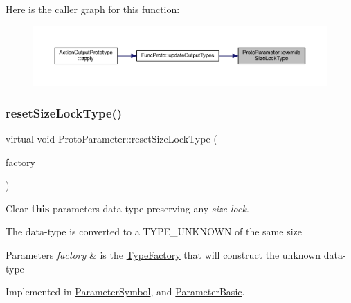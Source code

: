 Here is the caller graph for this function\+:
\nopagebreak
\begin{figure}[H]
\begin{center}
\leavevmode
\includegraphics[width=350pt]{class_proto_parameter_a05418aa9f8e8fa0c7499b99cd51e24d3_icgraph}
\end{center}
\end{figure}
\mbox{\label{class_proto_parameter_a15d92b3da7ab6b1cd6cf52dea6ee2978}} 
\subsubsection{\texorpdfstring{resetSizeLockType()}{resetSizeLockType()}}
{\footnotesize\ttfamily virtual void Proto\+Parameter\+::reset\+Size\+Lock\+Type (\begin{DoxyParamCaption}\item[{\mbox{\hyperlink{class_type_factory}{Type\+Factory}} $\ast$}]{factory }\end{DoxyParamCaption})\hspace{0.3cm}{\ttfamily [pure virtual]}}



Clear {\bfseries{this}} parameter\textquotesingle{}s data-\/type preserving any {\itshape size-\/lock}. 

The data-\/type is converted to a T\+Y\+P\+E\+\_\+\+U\+N\+K\+N\+O\+WN of the same size 
\begin{DoxyParams}{Parameters}
{\em factory} & is the \mbox{\hyperlink{class_type_factory}{Type\+Factory}} that will construct the unknown data-\/type \\
\hline
\end{DoxyParams}


Implemented in \mbox{\hyperlink{class_parameter_symbol_a5cc33796ba27a4f9032fecbc20a65e28}{Parameter\+Symbol}}, and \mbox{\hyperlink{class_parameter_basic_ac3aed750efa13f72a9a674ceb666eb9a}{Parameter\+Basic}}.

